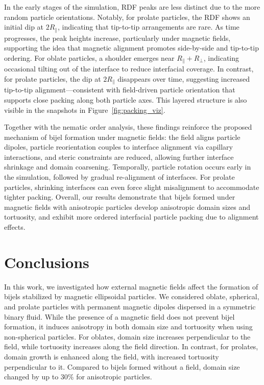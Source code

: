 In the early stages of the simulation, RDF peaks are less distinct due to the more random particle orientations. Notably, for prolate particles, 
the RDF shows an initial dip at \(2R_\parallel\), indicating that tip-to-tip arrangements are rare. As time progresses, the peak heights increase, 
particularly under magnetic fields, supporting the idea that magnetic alignment promotes side-by-side and tip-to-tip ordering. For oblate particles, 
a shoulder emerges near \(R_\parallel + R_\perp\), indicating occasional tilting out of the interface to reduce interfacial coverage. In contrast, 
for prolate particles, the dip at \(2R_\parallel\) disappears over time, suggesting increased tip-to-tip alignment—consistent with field-driven 
particle orientation that supports close packing along both particle axes. This layered structure is also visible in the snapshots in 
Figure~\ref{fig:packing_viz}.

Together with the nematic order analysis, these findings reinforce the proposed mechanism of bijel formation under magnetic fields: the field aligns 
particle dipoles, particle reorientation couples to interface alignment via capillary interactions, and steric constraints are reduced, allowing further 
interface shrinkage and domain coarsening. Temporally, particle rotation occurs early in the simulation, followed by gradual re-alignment of interfaces. 
For prolate particles, shrinking interfaces can even force slight misalignment to accommodate tighter packing. Overall, our results demonstrate that 
bijels formed under magnetic fields with anisotropic particles develop anisotropic domain sizes and tortuosity, and exhibit more ordered interfacial 
particle packing due to alignment effects.
    
\section{Conclusions}

In this work, we investigated how external magnetic fields affect the formation of bijels stabilized by magnetic ellipsoidal particles. We considered 
oblate, spherical, and prolate particles with permanent magnetic dipoles dispersed in a symmetric binary fluid. While the presence of a magnetic field 
does not prevent bijel formation, it induces anisotropy in both domain size and tortuosity when using non-spherical particles. For oblates, domain size 
increases perpendicular to the field, while tortuosity increases along the field direction. In contrast, for prolates, domain growth is enhanced along 
the field, with increased tortuosity perpendicular to it. Compared to bijels formed without a field, domain size changed by up to 30\% for anisotropic particles.

